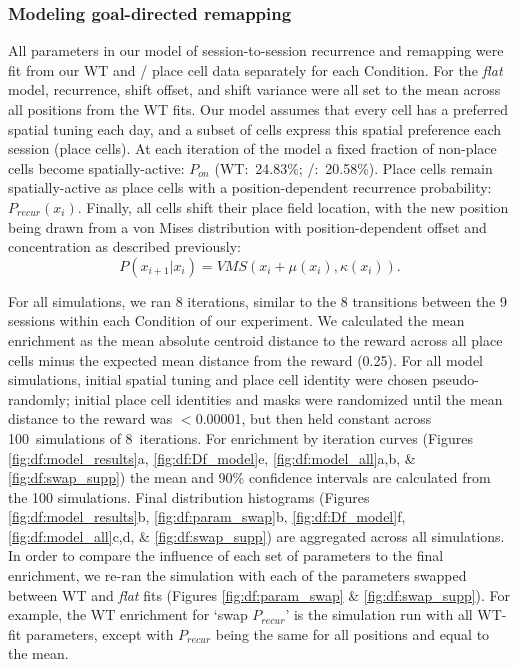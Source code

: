\subsubsection{Modeling goal-directed remapping}
All parameters in our model of session-to-session recurrence and remapping were fit from our WT and \df/ place cell data separately for each Condition. For the \emph{flat} model, recurrence, shift offset, and shift variance were all set to the mean across all positions from the WT fits. Our model assumes that every cell has a preferred spatial tuning each day, and a subset of cells express this spatial preference each session (place cells). At each iteration of the model a fixed fraction of non-place cells become spatially-active: $P_{on}$ (WT:~24.83\%; \df/:~20.58\%). Place cells remain spatially-active as place cells with a position-dependent recurrence probability: $P_{recur}(x_i)$. Finally, all cells shift their place field location, with the new position being drawn from a von Mises distribution with position-dependent offset and concentration as described previously:
$$P(x_{i+1}|x_i) = VMS(x_i + \mu(x_i), \kappa(x_i)).$$

For all simulations, we ran 8 iterations, similar to the 8 transitions between the 9 sessions within each Condition of our experiment. We calculated the mean enrichment as the mean absolute centroid distance to the reward across all place cells minus the expected mean distance from the reward (0.25). For all model simulations, initial spatial tuning and place cell identity were chosen pseudo-randomly; initial place cell identities and masks were randomized until the mean distance to the reward was $<$0.00001, but then held constant across 100~simulations of 8~iterations. For enrichment by iteration curves (Figures \ref{fig:df:model_results}a, \ref{fig:df:Df_model}e, \ref{fig:df:model_all}a,b, \& \ref{fig:df:swap_supp}) the mean and 90\% confidence intervals are calculated from the 100 simulations. Final distribution histograms (Figures \ref{fig:df:model_results}b, \ref{fig:df:param_swap}b, \ref{fig:df:Df_model}f, \ref{fig:df:model_all}c,d, \& \ref{fig:df:swap_supp}) are aggregated across all simulations. In order to compare the influence of each set of parameters to the final enrichment, we re-ran the simulation with each of the parameters swapped between WT and \emph{flat} fits (Figures \ref{fig:df:param_swap} \& \ref{fig:df:swap_supp}). For example, the WT enrichment for `swap $P_{recur}$' is the simulation run with all WT-fit parameters, except with $P_{recur}$ being the same for all positions and equal to the mean.

